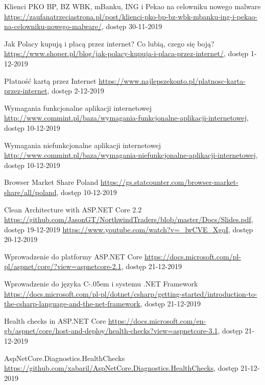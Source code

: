 \documentclass[12pt]{article}
\newcommand{\Csharp}{%
  {\settoheight{\dimen0}{C}C\kern-.05em \resizebox{!}{\dimen0}{\raisebox{\depth}{\# }}}}
\numberwithin{figure}{section}
\begin{document}
\begin{thebibliography}{99}
    Klienci PKO BP, BZ WBK, mBanku, ING i Pekao na celowniku nowego malware
    \url{https://zaufanatrzeciastrona.pl/post/klienci-pko-bp-bz-wbk-mbanku-ing-i-pekao-na-celowniku-nowego-malware/}, dostęp 30-11-2019
    
    Jak Polacy kupują i płacą przez internet? Co lubią, czego się boją?
    \url{https://www.shoper.pl/blog/jak-polacy-kupuja-i-placa-przez-internet/}, dostęp 1-12-2019
    
    Płatność kartą przez Internet
    \url{https://www.najlepszekonto.pl/platnosc-karta-przez-internet}, dostęp 2-12-2019
    
    Wymagania funkcjonalne aplikacji internetowej
    \url{http://www.commint.pl/baza/wymagania-funkcjonalne-aplikacji-internetowej}, dostęp 10-12-2019
    
    Wymagania niefunkcjonalne aplikacji internetowej
    \url{http://www.commint.pl/baza/wymagania-niefunkcjonalne-aplikacji-internetowej}, dostęp 10-12-2019
    
    Browser Market Share Poland
    \url{https://gs.statcounter.com/browser-market-share/all/poland}, dostęp 10-12-2019
    
    Clean Architecture with ASP.NET Core 2.2
    \url{https://github.com/JasonGT/NorthwindTraders/blob/master/Docs/Slides.pdf}, dostęp 19-12-2019
    \url{https://www.youtube.com/watch?v=_lwCVE_XgqI}, dostęp 20-12-2019
    
    Wprowadzenie do platformy ASP.NET Core
    \url{https://docs.microsoft.com/pl-pl/aspnet/core/?view=aspnetcore-2.1}, dostęp 21-12-2019
    
    Wprowadzenie do języka \Csharp i systemu .NET Framework
    \url{https://docs.microsoft.com/pl-pl/dotnet/csharp/getting-started/introduction-to-the-csharp-language-and-the-net-framework}, dostęp 21-12-2019
    
    Health checks in ASP.NET Core
    \url{https://docs.microsoft.com/en-gb/aspnet/core/host-and-deploy/health-checks?view=aspnetcore-3.1}, dostęp 21-12-2019
    
    AspNetCore.Diagnostics.HealthChecks
    \url{https://github.com/xabaril/AspNetCore.Diagnostics.HealthChecks}, dostęp 21-12-2019
    

\end{thebibliography}
\end{document}
